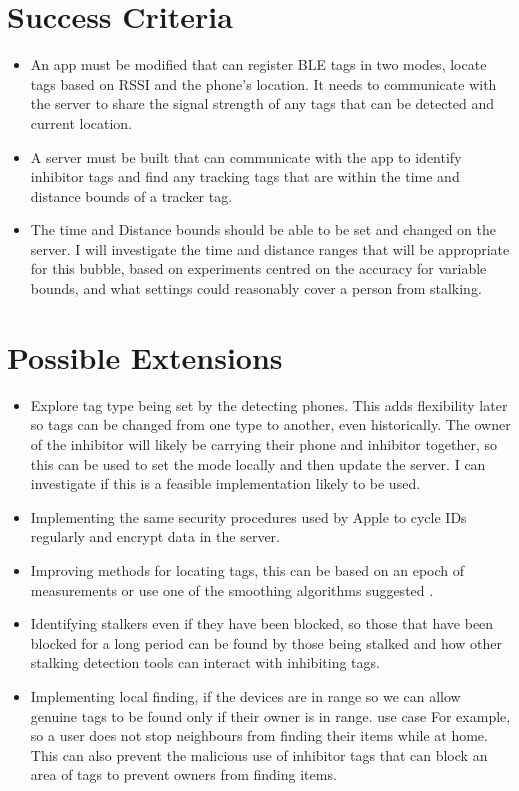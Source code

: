 \documentclass{article}
\begin{document}
\section{Success Criteria}
\begin{itemize}
\item{An app must be modified that can register BLE tags in two modes, locate tags based on RSSI and the phone's location. It needs to communicate with the server to share the signal strength of any tags that can be detected and current location.}

\item{A server must be built that can communicate with the app to identify inhibitor tags and find any tracking tags that are within the time and distance bounds of a tracker tag. }

\item{The time and Distance bounds should be able to be set and changed on the server. I will investigate the time and distance ranges that will be appropriate for this bubble, based on experiments centred on the accuracy for variable bounds, and what settings could reasonably cover a person from stalking.}

\end{itemize}
\section{Possible Extensions}
\begin{itemize}

\item{Explore tag type being set by the detecting phones. This adds flexibility later so tags can be changed from one type to another, even historically. The owner of the inhibitor will likely be carrying their phone and inhibitor together, so this can be used to set the mode locally and then update the server. I can investigate if this is a feasible implementation likely to be used.}

\item{Implementing the same security procedures used by Apple to cycle IDs regularly and encrypt data in the server.
}

\item{Improving methods for locating tags, this can be based on an epoch of measurements\cite{FingerprintingBLE} or use one of the smoothing algorithms suggested \cite{Smooth}. }

\item{Identifying stalkers even if they have been blocked, so those that have been blocked for a long period can be found by those being stalked and how other stalking detection tools can interact with inhibiting tags.}

\item{Implementing local finding, if the devices are in range so we can allow genuine tags to be found only if their owner is in range. use case For example, so a user does not stop neighbours from finding their items while at home. This can also prevent the malicious use of inhibitor tags that can block an area of tags to prevent owners from finding items.}
\end{itemize}
\end{document}
